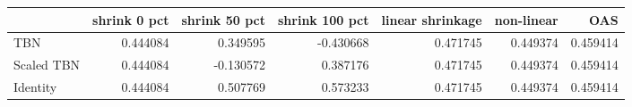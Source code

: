 \begin{tabular}{lrrrrrr}
\toprule
{} &  shrink 0 pct &  shrink 50 pct &  shrink 100 pct &  linear shrinkage &  non-linear &       OAS \\
\midrule
TBN        &      0.444084 &       0.349595 &       -0.430668 &          0.471745 &    0.449374 &  0.459414 \\
Scaled TBN &      0.444084 &      -0.130572 &        0.387176 &          0.471745 &    0.449374 &  0.459414 \\
Identity   &      0.444084 &       0.507769 &        0.573233 &          0.471745 &    0.449374 &  0.459414 \\
\bottomrule
\end{tabular}
